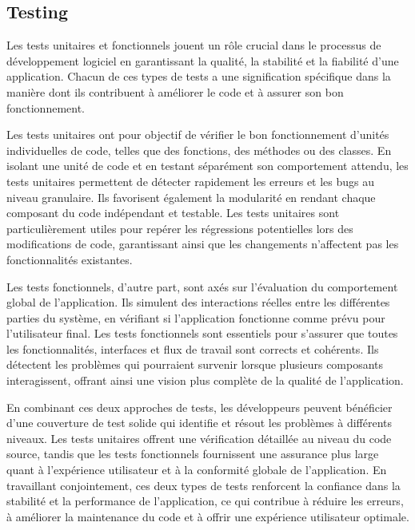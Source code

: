 \subsection{Testing}

Les tests unitaires et fonctionnels jouent un rôle crucial dans le processus de développement logiciel en garantissant la qualité, la stabilité et la fiabilité d'une application. Chacun de ces types de tests a une signification spécifique dans la manière dont ils contribuent à améliorer le code et à assurer son bon fonctionnement.

Les tests unitaires ont pour objectif de vérifier le bon fonctionnement d'unités individuelles de code, telles que des fonctions, des méthodes ou des classes. En isolant une unité de code et en testant séparément son comportement attendu, les tests unitaires permettent de détecter rapidement les erreurs et les bugs au niveau granulaire. Ils favorisent également la modularité en rendant chaque composant du code indépendant et testable. Les tests unitaires sont particulièrement utiles pour repérer les régressions potentielles lors des modifications de code, garantissant ainsi que les changements n'affectent pas les fonctionnalités existantes.

Les tests fonctionnels, d'autre part, sont axés sur l'évaluation du comportement global de l'application. Ils simulent des interactions réelles entre les différentes parties du système, en vérifiant si l'application fonctionne comme prévu pour l'utilisateur final. Les tests fonctionnels sont essentiels pour s'assurer que toutes les fonctionnalités, interfaces et flux de travail sont corrects et cohérents. Ils détectent les problèmes qui pourraient survenir lorsque plusieurs composants interagissent, offrant ainsi une vision plus complète de la qualité de l'application.

En combinant ces deux approches de tests, les développeurs peuvent bénéficier d'une couverture de test solide qui identifie et résout les problèmes à différents niveaux. Les tests unitaires offrent une vérification détaillée au niveau du code source, tandis que les tests fonctionnels fournissent une assurance plus large quant à l'expérience utilisateur et à la conformité globale de l'application. En travaillant conjointement, ces deux types de tests renforcent la confiance dans la stabilité et la performance de l'application, ce qui contribue à réduire les erreurs, à améliorer la maintenance du code et à offrir une expérience utilisateur optimale.

